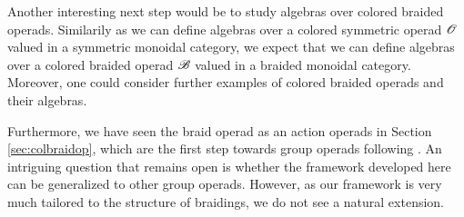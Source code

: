 \medskip

Another interesting next step would be to study algebras over colored braided
operads. Similarily as we can define algebras over a colored symmetric operad
$\mathscr{O}$ valued in a symmetric monoidal category, we expect that we can define
algebras over a colored braided operad $\mathscr{B}$ valued in a braided monoidal
category.
Moreover, one could consider further examples of colored braided operads and their algebras.


Furthermore, we have seen the braid operad as an action operads in Section
\ref{sec:colbraidop}, which are the first step towards group operads following
\cite{yau}. An intriguing question that remains open is whether the framework
developed here can be generalized to other group operads. However, as our
framework is very much tailored to the structure of braidings, we do not see a
natural extension.